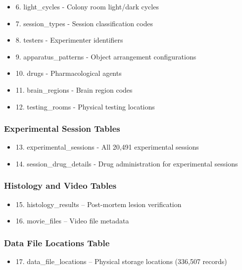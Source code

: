 \documentclass[12pt, titlepage]{article}
\begin{document}
\begin{itemize}

	\item{6. light\_cycles - Colony room light/dark cycles}
	\item{7. session\_types - Session classification codes}
	\item{8. testers - Experimenter identifiers}
	\item{9. apparatus\_patterns - Object arrangement configurations}
	\item{10. drugs - Pharmacological agents}
	\item{11. brain\_regions - Brain region codes}
	\item{12. testing\_rooms - Physical testing locations}

\end{itemize}

\subsubsection{Experimental Session Tables}

\begin{itemize}

	\item{13. experimental\_sessions - All 20,491 experimental sessions}
	\item{14. session\_drug\_details - Drug administration for experimental sessions}

\end{itemize}

\subsubsection{Histology and Video Tables}

\begin{itemize}

	\item{15. histology\_results – Post-mortem lesion verification}
	\item{16. movie\_files – Video file metadata}

\end{itemize}

\subsubsection{Data File Locations Table}

\begin{itemize}

	\item{17. data\_file\_locations – Physical storage locations (336,507 records)}

\end{itemize}
\end{document}
